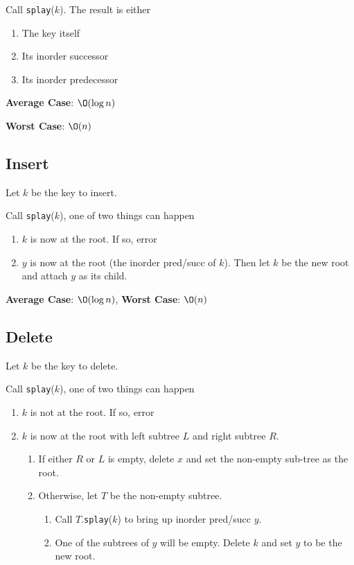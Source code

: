 \documentclass[12pt, letterpaper]{article}
\begin{document}
\begin{multicols*}{3}
        Call \texttt{splay}($k$). The result is either
        \begin{enumerate}
            \item The key itself
            \item Its inorder successor
            \item Its inorder predecessor
        \end{enumerate}

        {\bf Average Case}: $\O(\log n)$
        
        {\bf Worst Case}: $\O(n)$



        \subsection{Insert}
        Let $k$ be the key to insert.

        Call \texttt{splay}($k$), one of two things can happen
        \begin{enumerate}
            \item $k$ is now at the root. If so, error
            \item $y$ is now at the root (the inorder pred/succ of $k$). Then let $k$ be the new root and attach $y$ as its child.
        \end{enumerate}

        {\bf Average Case}: $\O(\log n)$, {\bf Worst Case}: $\O(n)$



        \subsection{Delete}
        Let $k$ be the key to delete.

        Call \texttt{splay}($k$), one of two things can happen
        \begin{enumerate}
            \item $k$ is not at the root. If so, error
            \item $k$ is now at the root with left subtree $L$ and right subtree $R$.
            \begin{enumerate}
                \item If either $R$ or $L$ is empty, delete $x$ and set the non-empty sub-tree as the root.
                \item Otherwise, let $T$ be the non-empty subtree.
                \begin{enumerate}
                    \item Call $T$.\texttt{splay}($k$) to bring up inorder pred/succ $y$.
                    \item One of the subtrees of $y$ will be empty. Delete $k$ and set $y$ to be the new root.
                \end{enumerate}
            \end{enumerate}
        \end{enumerate}


\end{multicols*}
\end{document}
